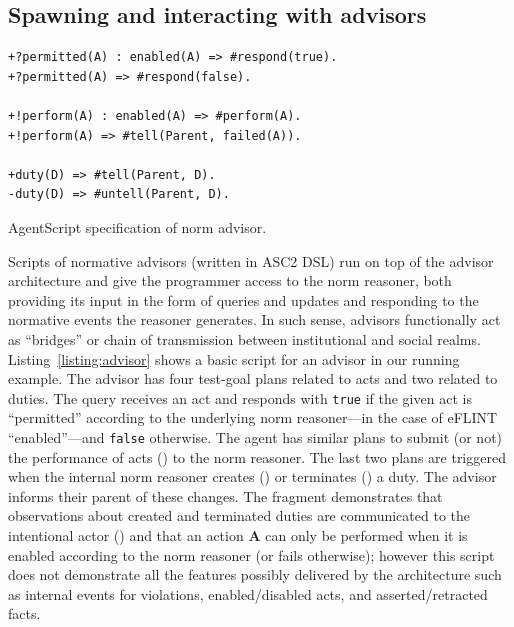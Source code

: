 \subsection{Spawning and interacting with advisors}
%
\label{sec:scenario}
\begin{listing}[t]
\begin{verbatim}
+?permitted(A) : enabled(A) => #respond(true).
+?permitted(A) => #respond(false).

+!perform(A) : enabled(A) => #perform(A).
+!perform(A) => #tell(Parent, failed(A)).

+duty(D) => #tell(Parent, D).
-duty(D) => #untell(Parent, D).
\end{verbatim}
\caption{AgentScript specification of norm advisor.}
\label{asc:advisor}
\label{listing:advisor}
\vspace{-5pt}\end{listing}
%
%
Scripts of normative advisors (written in ASC2 DSL) run on top of the advisor architecture and give the programmer access to the norm reasoner, both providing its input in the form of queries and updates and responding to the normative events the reasoner generates. In such sense, advisors functionally act as ``bridges'' or chain of transmission between institutional and social realms. 
%
Listing~\ref{listing:advisor} shows a basic script for an advisor in our running example. %
%
The advisor has four test-goal plans related to acts and two related to duties.
%
The query  receives an act and responds with \texttt{true} if the given act is ``permitted'' according to the underlying norm reasoner---in the case of eFLINT ``enabled''---and \texttt{false} otherwise.
%
The agent has similar plans to submit (or not) the performance of acts () to the norm reasoner. 
%
The last two plans are triggered when the internal norm reasoner creates () or terminates () a duty.
%
The advisor informs their parent of these changes.
%
The fragment demonstrates that observations about created and terminated duties are communicated to the intentional actor () and that an action \textbf{A} can only be performed when it is enabled according to the norm reasoner (or fails otherwise); however this script does not demonstrate all the features possibly delivered by the architecture such as internal events for violations, enabled/disabled acts, and asserted/retracted facts.
%

